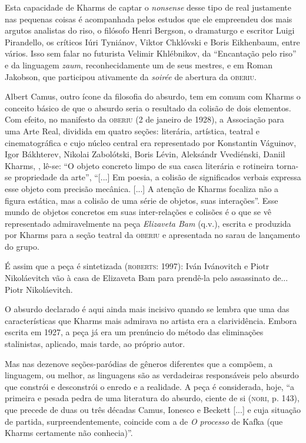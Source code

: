 Esta capacidade de Kharms de captar o \emph{nonsense} desse tipo de real
justamente nas pequenas coisas é acompanhada pelos estudos que ele
empreendeu dos mais argutos analistas do riso, o filósofo Henri Bergson,
o dramaturgo e escritor Luigi Pirandello, os críticos Iúri Tyniánov,
Viktor Chklóvski e Boris Eikhenbaum, entre vários. Isso sem falar no
futurista Velimir Khlébnikov, da ``Encantação pelo riso'' e da linguagem
\emph{zaum}, reconhecidamente um de seus mestres, e em Roman Jakobson,
que participou ativamente da \emph{soirée} de abertura da
\textsc{oberiu}.

Albert Camus, outro ícone da filosofia do absurdo, tem em comum com
Kharms o conceito básico de que o absurdo seria o resultado da colisão
de dois elementos. Com efeito, no manifesto da \textsc{oberiu} (2 de
janeiro de 1928), a Associação para uma Arte Real, dividida em quatro
seções: literária, artística, teatral e cinematográfica e cujo núcleo
central era representado por Konstantin Váguinov, Igor Bákhterev,
Nikolai Zabolótski, Boris Lévin, Aleksándr Vvediénski, Daniil Kharms, ,
lê-se: ``O objeto concreto limpo de sua casca literária e rotineira
torna-se propriedade da arte'', ``{[}...{]} Em poesia, a colisão de
significados verbais expressa esse objeto com precisão mecânica.
{[}...{]} A atenção de Kharms focaliza não a figura estática, mas a
colisão de uma série de objetos, suas interações''. Esse mundo de
objetos concretos em suas inter-relações e colisões é o que se vê
representado admiravelmente na peça \emph{Elizaveta Bam} (q.v.), escrita
e produzida por Kharms para a seção teatral da \textsc{oberiu} e
apresentada no sarau de lançamento do grupo.

É assim que a peça é sintetizada (\textsc{roberts}: 1997): Iván
Ivánovitch e Piotr Nikoláevitch vão à casa de Elizaveta Bam para
prendê-la pelo assassinato de... Piotr Nikoláevitch.

O absurdo declarado é aqui ainda mais incisivo quando se lembra que uma
das características que Kharms mais admirava no artista era a
clarividência. Embora escrita em 1927, a peça já era um prenúncio do
método das eliminações stalinistas, aplicado, mais tarde, ao próprio
autor.

Mas nas dezenove seções-paródias de gêneros diferentes que a compõem, a
linguagem, ou melhor, as linguagens são as verdadeiras responsáveis pelo
absurdo que constrói e desconstrói o enredo e a realidade. A peça é
considerada, hoje, ``a primeira e pesada pedra de uma literatura do
absurdo, ciente de si (\textsc{nori}, p. 143), que precede de duas ou
três décadas Camus, Ionesco e Beckett {[}...{]} e cuja situação de
partida, surpreendentemente, coincide com a de \emph{O} \emph{processo}
de Kafka (que Kharms certamente não conhecia)''.

